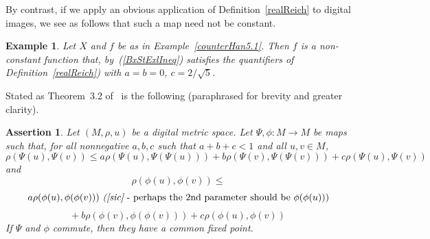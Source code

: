 \documentclass{article}
\newtheorem{assert}[thm]{Assertion}
\newtheorem{exl}[thm]{Example}
\numberwithin{thm}{section}
\begin{document}
By contrast, if we apply an obvious application of
Definition~\ref{realReich}
to digital images, we see 
as follows that such a map
need not be constant.

\begin{exl}
    Let $X$ and $f$ be as
    in Example~\ref{counterHan5.1}.
    Then $f$ is a 
    non-constant function
    that, by~(\ref{BxStExlIneq})
    satisfies the
    quantifiers of
    Definition~\ref{realReich}) with
    $a=b=0$,
    $c=2/\sqrt{5}$.
\end{exl}

Stated as Theorem~3.2 of~\cite{OkAk} is the following (paraphrased for
brevity and greater clarity).

\begin{assert}
\label{OkAk3.2}
    Let $(M,\rho,u)$ be a digital metric space. Let
    $\Psi, \phi: M \to M$ be maps
    such that, for all nonnegative
    $a,b,c$ such that $a+b+c < 1$
    and all $u,v \in M$,
    \begin{equation} 
    \label{OK3.2ineq1}
    \rho(\Psi(u),\Psi(v)) \le
    a \rho(\Psi(u),\Psi(\Psi(u))) +
    b \rho(\Psi(v),\Psi(\Psi(v))) +
    c \rho(\Psi(u), \Psi(v))
    \end{equation}
    and
    \[
    \rho(\phi(u),\phi(v)) \le 
    \] 
    \[ a \rho(\phi(u),\phi(\phi(v))) \mbox{ {\em ([sic]} - 
    perhaps the 2nd parameter should be 
    $\phi(\phi(u))$}) 
    \]
   \begin{equation}
    \label{OK3.2ineq2}
     + ~b \rho(\phi(v),\phi(\phi(v))) +
    c \rho(\phi(u), \phi(v))
    \end{equation}
    If $\Psi$ and $\phi$ commute, then they have a common fixed point.
\end{assert}
\end{document}
